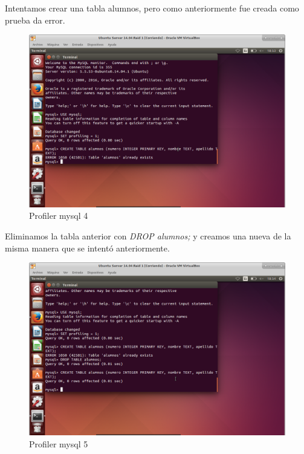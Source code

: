 Intentamos crear una tabla alumnos, pero como anteriormente fue creada como prueba da error.

\begin{figure}[H] %
	\centering
	\includegraphics[scale=0.35]{pics/profile4.png}  %
	\caption{Profiler mysql 4} \label{fig:p4}
\end{figure}

Eliminamos la tabla anterior con \textit{DROP alumnos;} y creamos una nueva de la misma manera que se intentó anteriormente.

\begin{figure}[H] %
	\centering
	\includegraphics[scale=0.35]{pics/profile5.png}  %
	\caption{Profiler mysql 5} \label{fig:p5}
\end{figure}

